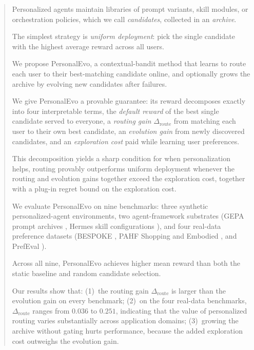 \documentclass{article} %
\begin{document}
\begin{abstract}
Personalized agents maintain libraries of prompt variants, skill modules, or orchestration policies, which we call \emph{candidates}, collected in an \emph{archive}.

The simplest strategy is \emph{uniform deployment}: pick the single candidate with the highest average reward across all users.

We propose PersonalEvo, a contextual-bandit method that learns to route each user to their best-matching candidate online, and optionally grows the archive by evolving new candidates after failures.

We give PersonalEvo a provable guarantee: its reward decomposes exactly into four interpretable terms, the \emph{default reward} of the best single candidate served to everyone, a \emph{routing gain} $\Delta_{\mathrm{route}}$ from matching each user to their own best candidate, an \emph{evolution gain} from newly discovered candidates, and an \emph{exploration cost} paid while learning user preferences.

This decomposition yields a sharp condition for when personalization helps, routing provably outperforms uniform deployment whenever the routing and evolution gains together exceed the exploration cost, together with a plug-in regret bound on the exploration cost.

We evaluate PersonalEvo on nine benchmarks: three synthetic personalized-agent environments, two agent-framework substrates (GEPA prompt archives \citep{agrawal2025geparp}, Hermes skill configurations \citep{hermes_selfevolution}), and four real-data preference datasets (BESPOKE \citep{jin2026personalizing}, PAHF Shopping and Embodied \citep{pahf2025}, and PrefEval \citep{zhao2025prefeval}).

Across all nine, PersonalEvo achieves higher mean reward than both the static baseline and random candidate selection.

Our results show that: (1)~the routing gain $\Delta_{\mathrm{route}}$ is larger than the evolution gain on every benchmark; (2)~on the four real-data benchmarks, $\Delta_{\mathrm{route}}$ ranges from $0.036$ to $0.251$, indicating that the value of personalized routing varies substantially across application domains; (3)~growing the archive without gating hurts performance, because the added exploration cost outweighs the evolution gain.


\end{abstract}
\end{document}
